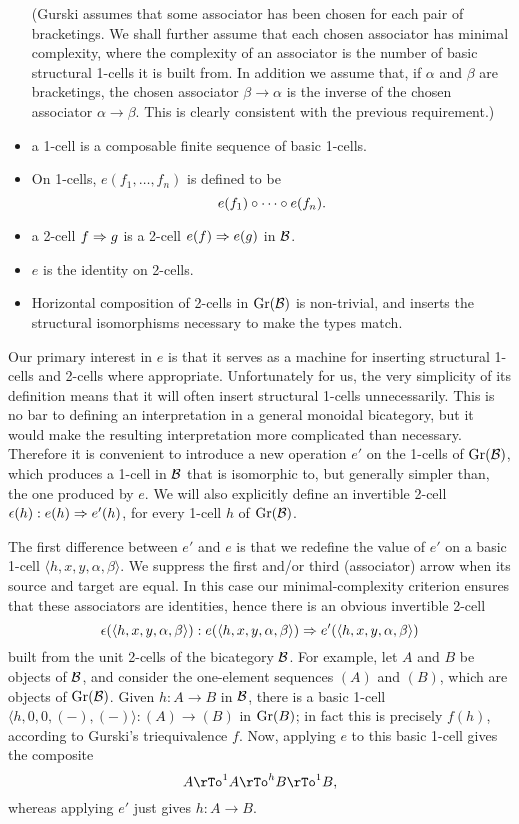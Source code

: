 \documentclass{robinthesisdraft}
\begin{document}
\begin{itemize}
			(Gurski assumes that some associator
			has been chosen for each pair of bracketings. We shall further assume
			that each chosen associator has minimal complexity, where the complexity of
			an associator is the number of basic structural 1-cells it is built
			from. In addition we assume that, if $\alpha$ and $\beta$ are bracketings,
			the chosen associator $\beta\to\alpha$ is the inverse of the
			chosen associator $\alpha\to\beta$. This is clearly consistent with the
			previous requirement.)
	\item a 1-cell is a composable finite sequence of basic 1-cells.
	\item On 1-cells, $e(f_{1},  \dots, f_{n})$ is defined to be
	\[
		e(f_{1}) \circ \cdots \circ e(f_{n}).
	\]
	\item a 2-cell $f \Rightarrow g$ is a 2-cell $e(f) \Rightarrow e(g)$ in $\mathcal{B}$.
	\item $e$ is the identity on 2-cells.
	\item Horizontal composition of 2-cells in $\mathrm{Gr}(\mathcal{B})$ is non-trivial, and
		inserts the structural isomorphisms necessary to make the types match.
\end{itemize}
Our primary interest in $e$ is that it serves as a machine for inserting
structural 1-cells and 2-cells where appropriate. Unfortunately for us,
the very simplicity of its definition means that it will often insert
structural 1-cells unnecessarily. This is no bar to defining an interpretation
in a general monoidal bicategory, but it would make the resulting interpretation
more complicated than necessary. Therefore it is convenient to introduce
a new operation $e'$ on the 1-cells of $\mathrm{Gr}(\mathcal{B})$, which produces a
1-cell in $\mathcal{B}$ that is isomorphic to, but generally simpler than, the
one produced by $e$. We will also explicitly define an invertible
2-cell $\epsilon(h): e(h) \Rightarrow e'(h)$, for every 1-cell $h$ of $\mathrm{Gr}(\mathcal{B})$.

The first difference between $e'$ and $e$ is that we redefine the value of
$e'$ on a basic 1-cell $\langle h,x,y,\alpha,\beta \rangle$. We suppress the
first and/or third (associator) arrow when its source and target are equal.
In this case our minimal-complexity criterion ensures that these associators
are identities, hence there is an obvious invertible 2-cell
\[
	\epsilon(\langle h,x,y,\alpha,\beta \rangle):
		e(\langle h,x,y,\alpha,\beta \rangle) \Rightarrow e'(\langle h,x,y,\alpha,\beta \rangle)
\]
built from the unit 2-cells of the bicategory $\mathcal{B}$.
%
For example, let $A$ and $B$ be objects
of $\mathcal{B}$, and consider the one-element sequences $(A)$ and $(B)$, which are
objects of $\mathrm{Gr}(\mathcal{B})$. Given $h: A\to B$ in $\mathcal{B}$, there is a basic 1-cell
$\langle h,0,0,(-),(-) \rangle: (A)\to(B)$ in $\mathrm{Gr}(B)$; in fact this is
precisely $f(h)$, according to Gurski's triequivalence $f$. Now, applying
$e$ to this basic 1-cell gives the composite
\[
	A \rTo^{1} A \rTo^{h} B \rTo^{1} B,
\]
whereas applying $e'$ just gives $h: A\to B$.
\end{document}
